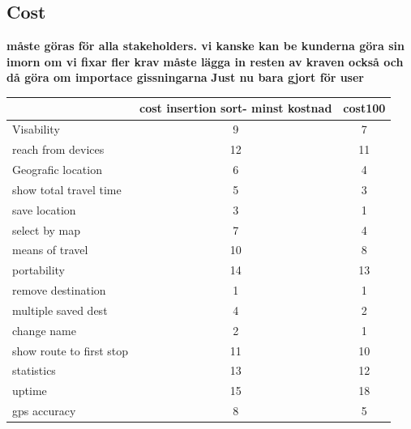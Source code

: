 \documentclass[a4paper]{article}
\begin{document}
	\subsection{Cost}
		\textbf{måste göras för alla stakeholders. vi kanske kan be kunderna göra sin imorn om vi fixar fler krav}
		\textbf{måste lägga in resten av kraven också och då göra om importace gissningarna}
		\textbf{Just nu bara gjort för user}		
		\begin{tabular}{|l|c|c|}
			\hline
		
			&cost insertion sort- minst kostnad &cost100 \\
			\hline
			Visability	&9	&7 \\
			\hline
			reach from devices	&12	&11 \\
			\hline			
			Geografic location	&6	&4 \\
			\hline
			show total travel time	&5	&3 \\
			\hline
			save location	&3	&1 \\
			\hline
			select by map	&7	&4 \\
			\hline
			means of travel	&10	&8 \\
			\hline
			portability	&14	&13 \\
			\hline
			remove destination	&1	&1 \\
			\hline
			multiple saved dest	&4	&2 \\
			\hline
			change name	&2	&1 \\
			\hline
			show route to first stop	&11	&10 \\
			\hline
			statistics	&13	&12 \\
			\hline
			uptime	&15	&18 \\
			\hline
			gps accuracy	&8	&5 \\
			\hline
		\end{tabular}
\end{document}
